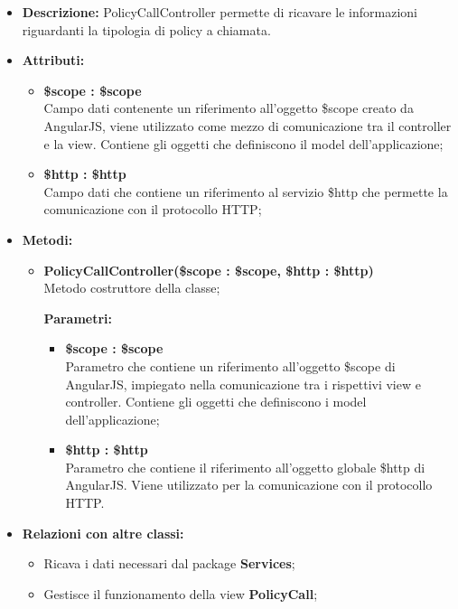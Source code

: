 \begin{itemize}
	\item \textbf{Descrizione:} PolicyCallController permette di ricavare le informazioni riguardanti la tipologia di policy a chiamata.
	\item \textbf{Attributi:}
	\begin{itemize}
		
		\item \textbf{\$scope : \$scope}\\
		Campo dati contenente un riferimento all'oggetto \$scope creato da AngularJS, viene utilizzato come mezzo di comunicazione tra il controller e la view. Contiene gli oggetti che definiscono il model dell'applicazione;
		
		\item \textbf{\$http : \$http }\\
		Campo dati che contiene un riferimento al servizio \$http che permette la comunicazione con il protocollo HTTP;
		
	\end{itemize}
	\item \textbf{Metodi:}
	\begin{itemize}
		
		\item \textbf{PolicyCallController(\$scope : \$scope, \$http : \$http)}\\
		Metodo costruttore della classe;
		\begin{description}
			\item[\textbf{Parametri:}]
		\end{description}
		\begin{itemize}
			\item \textbf{\$scope : \$scope}\\
			Parametro che contiene un riferimento all'oggetto \$scope di AngularJS, impiegato nella comunicazione tra i rispettivi view e controller. Contiene gli oggetti che definiscono i model dell'applicazione;
			
			\item \textbf{\$http : \$http}\\
			Parametro che contiene il riferimento all'oggetto globale \$http di AngularJS. Viene utilizzato per la comunicazione con il protocollo HTTP.
			
		\end{itemize}				
	\end{itemize}
	\item \textbf{Relazioni con altre classi:}
	\begin{itemize}
		\item Ricava i dati necessari dal package \textbf{Services};
		\item Gestisce il funzionamento della view \textbf{PolicyCall};
	\end{itemize}
\end{itemize}


